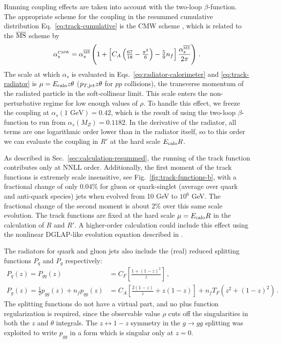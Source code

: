 \documentclass[letterpaper,11pt]{article}
\newcommand{\Fig}[1]{Fig.~\ref{#1}}
\newcommand{\Sec}[1]{Sec.~\ref{#1}}
\newcommand{\Eq}[1]{Eq.~\eqref{#1}}
\newcommand{\Eqs}[2]{Eqs.~\eqref{#1} and \eqref{#2}}
\begin{document}
Running coupling effects are taken into account with the two-loop $\beta$-function. 
%
The appropriate scheme for the coupling in the resummed cumulative distribution \Eq{eq:track-cumulative} is the CMW scheme \cite{Catani:1990rr}, which is related to the $\overline{\rm MS}$ scheme by
\begin{equation}
\alpha_s^{\mbox{\tiny CMW}} = \alpha_s^{\overline{\mbox{\tiny MS}}}\left(1+\left[C_A\left(\tfrac{67}{18}-\tfrac{\pi^2}{6}\right) - \tfrac{5}{9}n_f\right]\frac{\alpha_s^{\overline{\mbox{\tiny MS}}}}{2\pi}\right)\,.
\end{equation}
The scale at which $\alpha_s$ is evaluated in \Eqs{eq:radiator-calorimeter}{eq:track-radiator} is $\mu = E_{\rm calo}z\theta$ ($p_{T,\rm jet}z\theta$ for $pp$ collisions), the transverse momentum of the radiated particle in the soft-collinear limit. 
%
This scale enters the non-perturbative regime for low enough values of $\rho$. 
%
To handle this effect, we freeze the coupling at $\alpha_s(1 \mbox{ GeV}) = 0.42$, which is the result of using the two-loop $\beta$-function to run from $\alpha_s(M_Z) = 0.1182$. 
%
In the derivative of the radiator, all terms are one logarithmic order lower than in the radiator itself, so to this order we can evaluate the coupling in $R'$ at the hard scale $E_{\rm calo}R$. 

As described in \Sec{sec:calculation-resummed}, the running of the track function contributes only at NNLL order. 
%
Additionally, the first moment of the track functions is extremely scale insensitive, see \Fig{fig:track-functions-b}, with a fractional change of only 0.04$\%$ for gluon or quark-singlet (average over quark and anti-quark species) jets when evolved from 10 GeV to $10^6$ GeV.
%
The fractional change of the second moment is about $2\%$ over this same scale evolution.  
%
The track functions are fixed at the hard scale $\mu = E_{\rm calo}R$ in the calculation of $R$ and $R'$.
%
A higher-order calculation could include this effect using the nonlinear DGLAP-like evolution equation described in \cite{Chang:2013rca,Elder:2017bkd}. 

The radiators for quark and gluon jets also include the (real) reduced splitting functions $P_{q}$ and $P_{g}$ respectively:
\begin{align}
P_{q}(z) = P_{gq}(z) &= C_F\left[\frac{1+(1-z)^2}{z}\right]\,, \\
P_{g}(z) = \frac{1}{2}p_{gg}(z) + n_fp_{qg}(z) &= C_A \left[\frac{2(1-z)}{z} + z(1-z) \right] + n_fT_F(z^2 + (1-z)^2)\,.
\end{align}
The splitting functions do not have a virtual part, and no plus function regularization is required, since the observable value $\rho$ cuts off the singularities in both the $z$ and $\theta$ integrals. 
%
The $z\leftrightarrow 1-z$ symmetry in the $g\rightarrow gg$ splitting was exploited to write $p_{gg}$ in a form which is singular only at $z=0$. 
\end{document}
